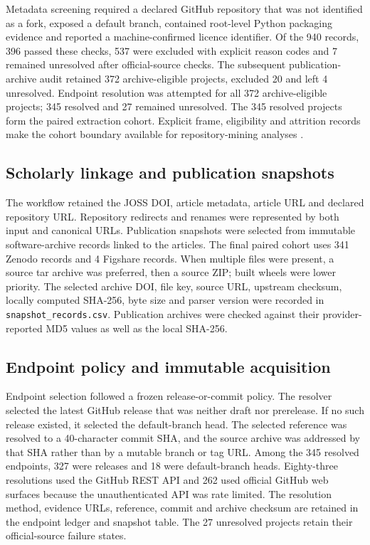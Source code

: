 \documentclass[10pt,a4paper]{article}
\newcommand{\code}[1]{\texttt{#1}}
\begin{document}
Metadata screening required a declared GitHub repository that was not identified as a fork, exposed a default branch, contained root-level Python packaging evidence and reported a machine-confirmed licence identifier. Of the 940 records, 396 passed these checks, 537 were excluded with explicit reason codes and 7 remained unresolved after official-source checks. The subsequent publication-archive audit retained 372 archive-eligible projects, excluded 20 and left 4 unresolved. Endpoint resolution was attempted for all 372 archive-eligible projects; 345 resolved and 27 remained unresolved. The 345 resolved projects form the paired extraction cohort. Explicit frame, eligibility and attrition records make the cohort boundary available for repository-mining analyses \cite{robredo2024cohort}.

\subsection{Scholarly linkage and publication snapshots}

The workflow retained the JOSS DOI, article metadata, article URL and declared repository URL. Repository redirects and renames were represented by both input and canonical URLs. Publication snapshots were selected from immutable software-archive records linked to the articles. The final paired cohort uses 341 Zenodo records and 4 Figshare records. When multiple files were present, a source tar archive was preferred, then a source ZIP; built wheels were lower priority. The selected archive DOI, file key, source URL, upstream checksum, locally computed SHA-256, byte size and parser version were recorded in \code{snapshot\_records.csv}. Publication archives were checked against their provider-reported MD5 values as well as the local SHA-256.

\subsection{Endpoint policy and immutable acquisition}

Endpoint selection followed a frozen release-or-commit policy. The resolver selected the latest GitHub release that was neither draft nor prerelease. If no such release existed, it selected the default-branch head. The selected reference was resolved to a 40-character commit SHA, and the source archive was addressed by that SHA rather than by a mutable branch or tag URL. Among the 345 resolved endpoints, 327 were releases and 18 were default-branch heads. Eighty-three resolutions used the GitHub REST API and 262 used official GitHub web surfaces because the unauthenticated API was rate limited. The resolution method, evidence URLs, reference, commit and archive checksum are retained in the endpoint ledger and snapshot table. The 27 unresolved projects retain their official-source failure states.
\end{document}
